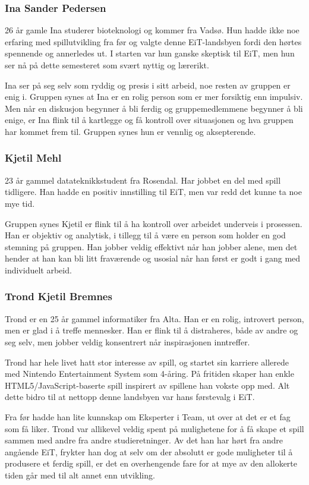 	\subsubsection{Ina Sander Pedersen}
	26 år gamle Ina studerer bioteknologi og kommer fra Vadsø. Hun hadde ikke noe erfaring med spillutvikling fra før og valgte denne EiT-landsbyen fordi den hørtes spennende og annerledes ut. I starten var hun ganske skeptisk til EiT, men hun ser nå på dette semesteret som svært nyttig og lærerikt.

	Ina ser på seg selv som ryddig og presis i sitt arbeid, noe resten av gruppen er enig i. Gruppen synes at Ina er en rolig person som er mer forsiktig enn impulsiv. Men når en diskusjon begynner å bli ferdig og gruppemedlemmene begynner å bli enige, er Ina flink til å kartlegge og få kontroll over situasjonen og hva gruppen har kommet frem til. Gruppen synes hun er vennlig og aksepterende.

	\subsubsection{Kjetil Mehl}
	23 år gammel datateknikkstudent fra Rosendal. Har jobbet en del med spill tidligere. Han hadde en positiv innstilling til EiT, men var redd det kunne ta noe mye tid.

	Gruppen synes Kjetil er flink til å ha kontroll over arbeidet underveis i prosessen. Han er objektiv og analytisk, i tillegg til å være en person som holder en god stemning på gruppen. Han jobber veldig effektivt når han jobber alene, men det hender at han kan bli litt fraværende og usosial når han først er godt i gang med individuelt arbeid.


	\subsubsection{Trond Kjetil Bremnes}
	Trond er en 25 år gammel informatiker fra Alta. Han er en rolig, introvert person, men er glad i å treffe mennesker. Han er flink til å distraheres, både av andre og seg selv, men jobber veldig konsentrert når inspirasjonen inntreffer.

	Trond har hele livet hatt stor interesse av spill, og startet sin karriere allerede med Nintendo Entertainment System som 4-åring. På fritiden skaper han enkle HTML5/JavaScript-baserte spill inspirert av spillene han vokste opp med. Alt dette bidro til at nettopp denne landsbyen var hans førstevalg i EiT.

	Fra før hadde han lite kunnskap om Eksperter i Team, ut over at det er et fag som få liker. Trond var allikevel veldig spent på mulighetene for å få skape et spill sammen med andre fra andre studieretninger. Av det han har hørt fra andre angående EiT, frykter han dog at selv om der absolutt er gode muligheter til å produsere et ferdig spill, er det en overhengende fare for at mye av den allokerte tiden går med til alt annet enn utvikling.


